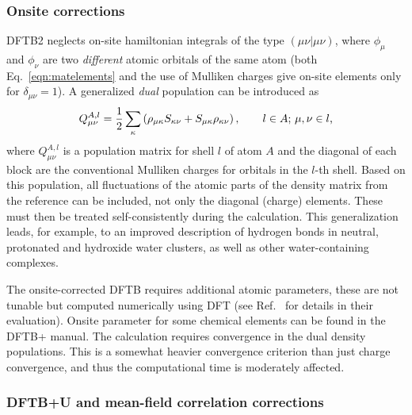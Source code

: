 \documentclass[reprint,onecolumn,superscriptaddress]{revtex4-1}
\newcommand{\dftbp}{DFTB+}
\begin{document}
\subsubsection{Onsite corrections}
\label{sec:onsite-correction}

DFTB2 neglects on-site hamiltonian integrals of the type $(\mu\nu|\mu\nu)$,
where $\phi_\mu$ and $\phi_\nu$ are two {\em different} atomic orbitals of the
same atom (both Eq.~\eqref{eqn:matelements} and the use of Mulliken charges give
on-site elements only for $\delta_{\mu\nu} = 1$). A generalized \textit{dual}
population\cite{PhysRevB.73.045110} can be introduced as
\begin{equation}
  Q_{\mu\nu}^{A,l} = \frac{1}{2} \sum_\kappa \left(
    \rho_{\mu\kappa}S_{\kappa\nu} + S_{\mu\kappa} \rho_{\kappa\nu} \right),
  \qquad
  l\in A;\,\mu,\nu\in l
  \text,
  \label{eqn:dualpop}
\end{equation}
where $Q_{\mu\nu}^{A,l}$ is a population matrix for shell $l$ of atom $A$
and the diagonal of each block are the conventional Mulliken charges for
orbitals in the $l$-th shell. Based on this population, all fluctuations of the
atomic parts of the density matrix from the reference can be included, not only
the diagonal (charge) elements.  These must then be treated self-consistently
during the calculation. This generalization leads, for example, to an improved
description of hydrogen bonds in neutral, protonated and hydroxide water
clusters, as well as other water-containing complexes.\cite{Dominguez2015}

The onsite-corrected DFTB requires additional atomic parameters, these are not
tunable but computed numerically using DFT (see Ref.~\cite{Dominguez2013}
for details in their evaluation). Onsite parameter for some chemical elements
can be found in the \dftbp{} manual. The calculation requires convergence in the
dual density populations. This is a somewhat heavier convergence criterion than
just charge convergence, and thus the computational time is moderately
affected.


\subsubsection{DFTB+U and mean-field correlation corrections}
\end{document}

